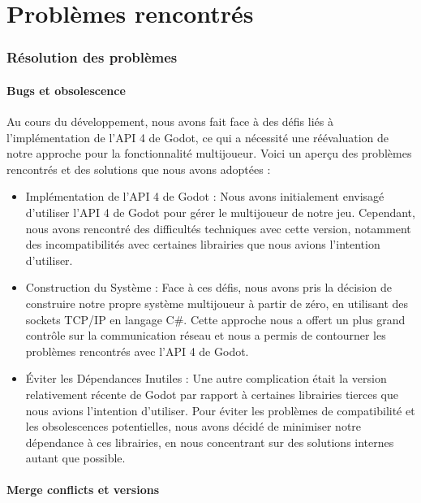 \documentclass[
	article,			%
	11pt,				%
	oneside,			%
	a4paper,			%
	chapter=TITLE,
	french,			%
	sumario=tradicional
	]{base_nt}
\begin{document}
\part{Problèmes rencontrés}
\section{Résolution des problèmes}

\subsection{Bugs et obsolescence}

Au cours du développement, nous avons fait face à des défis liés à l'implémentation de l'API 4 de Godot, ce qui a nécessité une réévaluation de notre approche pour la fonctionnalité multijoueur. Voici un aperçu des problèmes rencontrés et des solutions que nous avons adoptées :

\begin{itemize}
    \item Implémentation de l'API 4 de Godot : Nous avons initialement envisagé d'utiliser l'API 4 de Godot pour gérer le multijoueur de notre jeu. Cependant, nous avons rencontré des difficultés techniques avec cette version, notamment des incompatibilités avec certaines librairies que nous avions l'intention d'utiliser.
    \item Construction du Système : Face à ces défis, nous avons pris la décision de construire notre propre système multijoueur à partir de zéro, en utilisant des sockets TCP/IP en langage C\#. Cette approche nous a offert un plus grand contrôle sur la communication réseau et nous a permis de contourner les problèmes rencontrés avec l'API 4 de Godot.
    \item Éviter les Dépendances Inutiles : Une autre complication était la version relativement récente de Godot par rapport à certaines librairies tierces que nous avions l'intention d'utiliser. Pour éviter les problèmes de compatibilité et les obsolescences potentielles, nous avons décidé de minimiser notre dépendance à ces librairies, en nous concentrant sur des solutions internes autant que possible.
\end{itemize}

\newpage

\subsection{Merge conflicts et versions}
\end{document}
